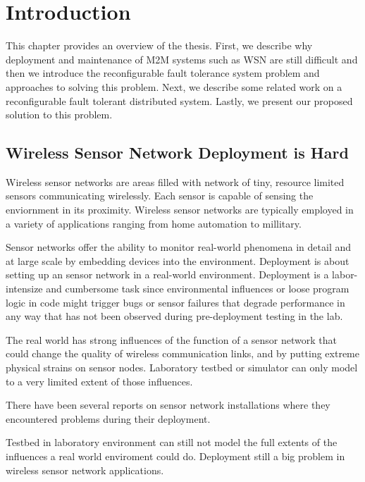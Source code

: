 \cleardoublepage
\singlespacing
\chapter{Introduction}
\label{c:intro}
\doublespacing\nointerlineskip

This chapter provides an overview of the thesis. First, we describe why
deployment and maintenance of M2M systems such as WSN are still difficult and then we introduce the reconfigurable fault tolerance system problem and approaches to solving this
problem. Next, we describe some related work on a reconfigurable fault tolerant distributed system. Lastly, we present our proposed solution to this problem.

\section{Wireless Sensor Network Deployment is Hard}

Wireless sensor networks are areas filled with network of tiny, resource
limited sensors communicating wirelessly. Each sensor is capable of sensing the
enviornment in its proximity. Wireless sensor networks are typically employed in
a variety of applications ranging from home automation to millitary.

Sensor networks offer the ability to monitor real-world phenomena in detail and
at large scale by embedding devices into the environment. Deployment is
about setting up an sensor network in a real-world environment. Deployment is
a labor-intensize and cumbersome task since environmental influences or
loose program logic in code might trigger bugs or sensor failures that
degrade performance in any way that has not been observed during pre-deployment
testing in the lab.

The real world has strong influences of the function of a sensor network that
could change the quality of wireless communication links, and by putting
extreme physical strains on sensor nodes. Laboratory testbed or simulator can 
only model to a very limited extent of those influences.

There have been several reports on sensor network installations where they
encountered problems during their
deployment\cite{Barrenetxea2008}\cite{Polastre2004}\cite{Arora2004}\cite{Tateson2005}\cite{Padhy2005}\cite{Stoianov2007}\cite{Tolle2005}\cite{Werner-Allen2006a}.

Testbed in laboratory environment can still not model the full extents of the
influences a real world enviroment could do. Deployment still a big problem in
wireless sensor network applications.

